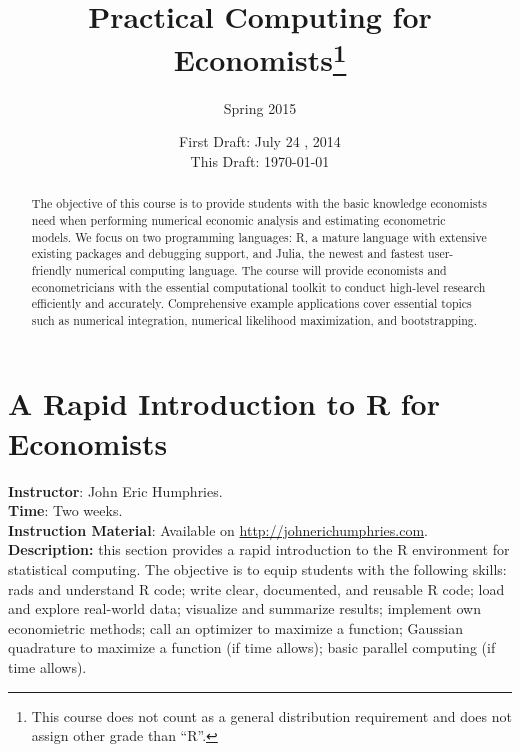 




\title{\textbf{Practical Computing for Economists}\footnote{This course does not count as a general distribution requirement and does not assign other grade than ``R''. }}
\author{Spring 2015}
\date{First Draft: July 24 , 2014 \\ This Draft: \today}
\maketitle

\begin{abstract}
\noindent The objective of this course is to provide students with the basic knowledge economists need when performing numerical economic analysis and estimating econometric models.  We focus on two programming languages: R, a mature language with extensive existing packages and debugging support, and Julia, the newest and fastest user-friendly numerical computing language. The course will provide economists and econometricians with the essential computational toolkit to conduct high-level research efficiently and accurately. Comprehensive example applications cover essential topics such as numerical integration, numerical likelihood maximization, and bootstrapping. \end{abstract}


\section{A Rapid Introduction to R for Economists}
\noindent \textbf{Instructor}: John Eric Humphries.\\
\noindent \textbf{Time}: Two weeks.\\
\noindent \textbf{Instruction Material}: Available on \href{http://johnerichumphries.com}{http://johnerichumphries.com}.\\
\noindent \textbf{Description:} this section provides a rapid introduction to the R environment for statistical computing. The objective is to equip students with the following skills: rads and understand R code; write clear, documented, and reusable R code; load and explore real-world data; visualize and summarize results; implement own economietric methods; call an optimizer to maximize a function; Gaussian quadrature to maximize a function (if time allows); basic parallel computing (if time allows). 

